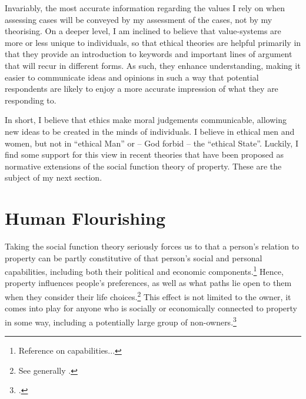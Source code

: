 {Invariably, the most accurate information regarding the values I rely on when assessing cases will be conveyed by my assessment of the cases, not by my theorising. On a deeper level, I am inclined to believe that value-systems are more or less unique to individuals, so that ethical theories are helpful primarily in that they provide an introduction to keywords and important lines of argument that will recur in different forms. As such, they enhance understanding, making it easier to communicate ideas and opinions in such a way that potential respondents are likely to enjoy a more accurate impression of what they are responding to. 

In short, I believe that ethics make moral judgements communicable, allowing new ideas to be created in the minds of individuals. I believe in ethical men and women, but not in ``ethical Man'' or -- God forbid -- the ``ethical State''. Luckily, I find some support for this view in recent theories that have been proposed as normative extensions of the social function theory of property. These are the subject of my next section.
}

\section{Human Flourishing}\label{sec:hf}

Taking the social function theory seriously forces us to  that a person's relation to property can be partly constitutive of that person's social and personal capabilities, including both their political and economic components.\footnote{Reference on capabilities...} Hence, property influences people's preferences, as well as what paths lie open to them when they consider their life choices.\footnote{See generally \cite{alexander09}.} This effect is not limited to the owner, it comes into play for anyone who is socially or economically connected to property in some way, including a potentially large group of non-owners.\footcite[128-129]{alexander09d} %

